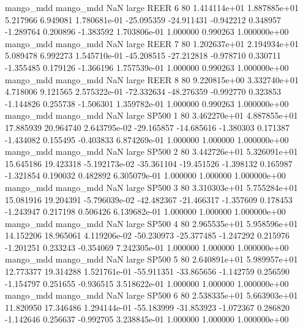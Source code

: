 mango_mdd mango_mdd                   NaN      large     REER                 6 80 1.414114e+01   1.887885e+01      5.217966       6.949081  1.780681e-01    -25.095359    -24.911431    -0.942212       0.348957 -1.289764   0.200896    -1.383592   1.703806e-01            1.000000        0.990263        1.000000e+00
mango_mdd mango_mdd                   NaN      large     REER                 7 80 1.202637e+01   2.194934e+01      5.089478       6.992273  1.545710e-01    -45.208515    -27.212818    -0.978710       0.330711 -1.355485   0.179126    -1.366196   1.757539e-01            1.000000        0.990263        1.000000e+00
mango_mdd mango_mdd                   NaN      large     REER                 8 80 9.220815e+00   3.332740e+01      4.718006       9.121565  2.575322e-01    -72.332634    -48.276359    -0.992770       0.323853 -1.144826   0.255738    -1.506301   1.359782e-01            1.000000        0.990263        1.000000e+00
mango_mdd mango_mdd                   NaN      large    SP500                 1 80 3.462270e+01   4.887855e+01     17.885939      20.964740  2.643795e-02    -29.165857    -14.685616    -1.380303       0.171387 -1.434082   0.155495    -0.403833   6.874269e-01            1.000000        1.000000        1.000000e+00
mango_mdd mango_mdd                   NaN      large    SP500                 2 80 3.442726e+01   5.326091e+01     15.645186      19.423318 -5.192173e-02    -35.361104    -19.451526    -1.398132       0.165987 -1.321854   0.190032     0.482892   6.305079e-01            1.000000        1.000000        1.000000e+00
mango_mdd mango_mdd                   NaN      large    SP500                 3 80 3.310303e+01   5.755284e+01     15.081916      19.204391 -5.796039e-02    -42.482367    -21.466317    -1.357609       0.178453 -1.243947   0.217198     0.506426   6.139682e-01            1.000000        1.000000        1.000000e+00
mango_mdd mango_mdd                   NaN      large    SP500                 4 80 2.965535e+01   5.958596e+01     14.152206      18.965061  4.119206e-02    -50.230973    -25.377485    -1.247292       0.215976 -1.201251   0.233243    -0.354069   7.242305e-01            1.000000        1.000000        1.000000e+00
mango_mdd mango_mdd                   NaN      large    SP500                 5 80 2.640891e+01   5.989957e+01     12.773377      19.314288  1.521761e-01    -55.911351    -33.865656    -1.142759       0.256590 -1.154797   0.251655    -0.936515   3.518622e-01            1.000000        1.000000        1.000000e+00
mango_mdd mango_mdd                   NaN      large    SP500                 6 80 2.538335e+01   5.663903e+01     11.820950      17.346486  1.294144e-01    -55.183999    -31.853923    -1.072367       0.286820 -1.142646   0.256637    -0.992705   3.238845e-01            1.000000        1.000000        1.000000e+00
